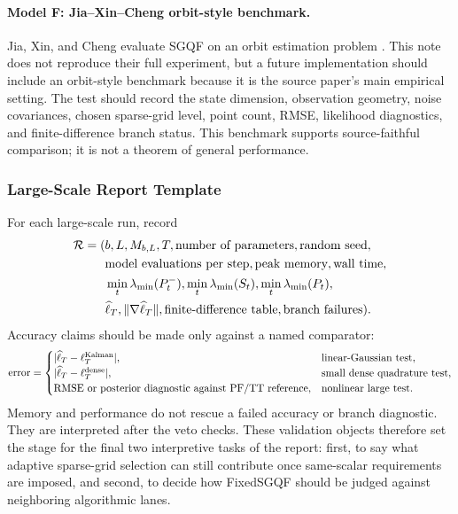 \documentclass[11pt]{article}
\numberwithin{equation}{section}
\newcommand{\ellhat}{\widehat\ell}
\begin{document}
\paragraph{Model F: Jia--Xin--Cheng orbit-style benchmark.}
Jia, Xin, and Cheng evaluate SGQF on an orbit estimation problem
\cite[Section 4]{jia2012sparsegrid}.  This note does not reproduce their full
experiment, but a future implementation should include an orbit-style
benchmark because it is the source paper's main empirical setting.  The test
should record the state dimension, observation geometry, noise covariances,
chosen sparse-grid level, point count, RMSE, likelihood diagnostics, and
finite-difference branch status.  This benchmark supports source-faithful
comparison; it is not a theorem of general performance.

\subsubsection{Large-Scale Report Template}
\label{subsec:p32-large-scale-report}

For each large-scale run, record
\begin{equation}
\begin{aligned}
  \mathcal R
  =
  (&b,L,M_{b,L},T,\hbox{number of parameters},\hbox{random seed},\\
  &\hbox{model evaluations per step},\hbox{peak memory},\hbox{wall time},\\
  &\min_t\lambda_{\min}(P_t^-),
  \min_t\lambda_{\min}(S_t),
  \min_t\lambda_{\min}(P_t),\\
  &\ellhat_T,\|\nabla\ellhat_T\|,
  \hbox{finite-difference table},\hbox{branch failures}).
\end{aligned}
  \label{eq:p32-large-scale-report}
\end{equation}
Accuracy claims should be made only against a named comparator:
\begin{equation}
  \hbox{error}
  =
  \begin{cases}
  |\ellhat_T-\ell_T^{\rm Kalman}|, & \hbox{linear-Gaussian test},\\
  |\ellhat_T-\ell_T^{\rm dense}|, & \hbox{small dense quadrature test},\\
  \hbox{RMSE or posterior diagnostic against PF/TT reference}, &
  \hbox{nonlinear large test}.
  \end{cases}
  \label{eq:p32-comparator-errors}
\end{equation}
Memory and performance do not rescue a failed accuracy or branch diagnostic.
They are interpreted after the veto checks.  These validation objects therefore
set the stage for the final two interpretive tasks of the report: first, to say
what adaptive sparse-grid selection can still contribute once same-scalar
requirements are imposed, and second, to decide how FixedSGQF should be judged
against neighboring algorithmic lanes.
\end{document}
